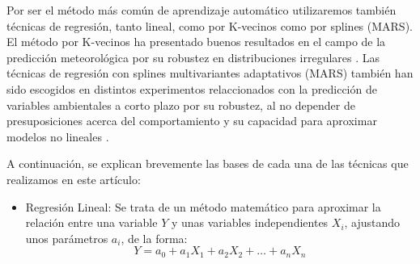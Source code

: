 \documentclass[journal]{IEEEtran}
\begin{document}
Por ser el método más común de aprendizaje automático utilizaremos también técnicas de regresión, tanto lineal, como por K-vecinos como por splines (MARS). El método por K-vecinos ha presentado buenos resultados en el campo de la predicción meteorológica por su robustez en distribuciones irregulares \cite{HUANG201789}. Las técnicas de regresión con splines multivariantes adaptativos (MARS) también han sido escogidos en distintos experimentos relaccionados con la predicción de variables ambientales a corto plazo por su robustez, al no depender de presuposiciones acerca del comportamiento y su capacidad para aproximar modelos no lineales \cite{KRZEMIEN2019777} \cite{PA_LEWIS1991_864}.


A continuación, se explican brevemente las bases de cada una de las técnicas que realizamos en este artículo:
\begin{itemize}
    \item Regresión Lineal: Se trata de un método matemático para aproximar la relación entre una variable $Y$ y unas variables independientes $X_i$, ajustando unos parámetros $a_i$, de la forma:
\begin{equation}
\label{eqn:Reg}
 Y = a_0+a_1X_1 + a_2X_2+\ldots + a_nX_n
\end{equation}


\end{itemize}
\end{document}
